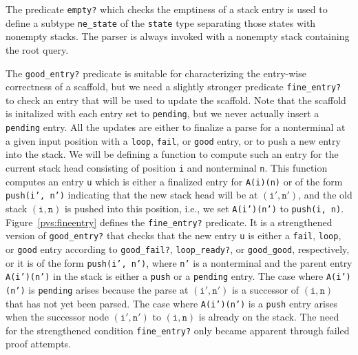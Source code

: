 \documentclass[sigplan,10pt,anonymous,review]{acmart}\settopmatter{printfolios=true,printccs=false,printacmref=false}
\begin{document}
\begin{CCSXML}
The  predicate \texttt{empty?} which checks the emptiness of a stack
entry is used to define a subtype \texttt{ne\_state} of the \texttt{state}
type separating those states with nonempty stacks.  The parser is always invoked with a nonempty stack containing the root query.  
%   

The \texttt{good\_entry?}  predicate is suitable for characterizing
the entry-wise correctness of a scaffold, but we need a slightly
stronger predicate \texttt{fine\_entry?} to check an entry that
will be used to update the scaffold.  Note that the scaffold is initalized
with each entry set to \texttt{pending}, but we never actually insert
a \texttt{pending} entry.  All the updates are either to finalize
a parse for a nonterminal at a given input position with a \texttt{loop},
\texttt{fail}, or \texttt{good} entry, or to push a new entry into the stack.
We will be defining a function to compute such an entry for the current stack head consisting of position \texttt{i} and nonterminal \texttt{n}\@.  This function
computes an entry \texttt{u} which is either a finalized entry for
\texttt{A(i)(n)} or of the form \texttt{push(i', n')}
indicating that the new stack head will be at $(\mathtt{i'}, \mathtt{n'})$, and
the old stack $(\mathtt{i}, \mathtt{n})$ is pushed into this position, i.e., we set
\texttt{A(i')(n')} to \texttt{push(i, n)}\@.  
Figure~\ref{pvs:fineentry} defines the \texttt{fine\_entry?} predicate. 
It is a strengthened version of  \texttt{good\_entry?} that checks that 
the new entry \texttt{u} is either a \texttt{fail}, \texttt{loop}, or
\texttt{good} entry according to \texttt{good\_fail?}, \texttt{loop\_ready?}, or \texttt{good\_good}, respectively, or it is of the form \texttt{push(i', n')}, where
\texttt{n'} is a nonterminal and the parent entry \texttt{A(i')(n')} in the stack
is either a \texttt{push} or a \texttt{pending} entry.  The case where \texttt{A(i')(n')} is \texttt{pending} arises because the parse at $(\mathtt{i', n'})$ is a successor of $(\mathtt{i, n})$ that has not yet been parsed.  The case where
\texttt{A(i')(n')} is a \texttt{push} entry arises when the successor node $(\mathtt{i', n'})$ to $(\mathtt{i, n})$ is already on the stack.  
The need for the strengthened condition \texttt{fine\_entry?} 
only became apparent through failed proof attempts.  


\end{CCSXML}
\end{document}
